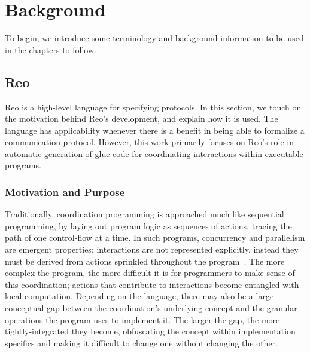 
\chapter{Background}
\label{sec:background}
To begin, we introduce some terminology and background information to be used in the chapters to follow.

\section{Reo}
\label{sec:reo_background}
Reo is a high-level language for specifying protocols. In this section, we touch on the motivation behind Reo's development, and explain how it is used. The language has applicability whenever there is a benefit in being able to formalize a communication protocol. However, this work primarily focuses on Reo's role in automatic generation of glue-code for coordinating interactions within executable programs.  

\subsection{Motivation and Purpose}
\label{sec:reo_motivation}
Traditionally, coordination programming is approached much like sequential programming, by laying out program logic as sequences of actions, tracing the path of one control-flow at a time. In such programs, concurrency and parallelism are emergent properties; interactions are not represented explicitly, instead they must be derived from actions sprinkled throughout the program~\cite{arbab2011puff}. The more complex the program, the more difficult it is for programmers to make sense of this coordination; actions that contribute to interactions become entangled with local computation. Depending on the language, there may also be a large conceptual gap between the coordination's underlying concept and the granular operations the program uses to implement it. The larger the gap, the more tightly-integrated they become, obfuscating the concept within implementation specifics and making it difficult to change one without changing the other.

